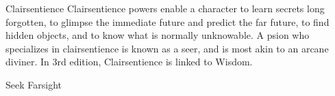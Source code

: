 Clairsentience
Clairsentience powers enable a character to learn secrets long forgotten, to
glimpse the immediate future and predict the far future, to find hidden
objects, and to know what is normally unknowable. A psion who specializes
in clairsentience is known as a seer, and is most akin to an arcane diviner.
In 3rd edition, Clairsentience is linked to Wisdom.

Seek
Farsight
